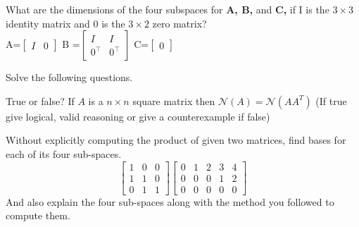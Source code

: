 \documentclass[solution,addpoints,12pt]{exam}
\begin{document}
\begin{questions}
\question[1] 
What are the dimensions of the four subspaces for \textbf{A, B,} and \textbf{C,} if I is the $3 \times 3$
identity matrix and 0 is the $3 \times 2$ zero matrix?\\
 A=$ \begin{bmatrix}
I & 0
\end{bmatrix} $ 
B =$ \begin{bmatrix}
I& I\\ 0^\top & 0^\top
\end{bmatrix}$
C=$\begin{bmatrix}
0
\end{bmatrix}$
\begin{solution}

\end{solution}


\question[2] 
Solve the following questions.

\question[1] 
True or false? If $A$ is a $n\times n$ square matrix then $\mathcal{N}(A) = \mathcal{N}(AA^T)$ (If true give logical, valid reasoning or give a counterexample if false)
\begin{solution}

\end{solution}

\question[2] 
Without explicitly computing the product of given two matrices, find bases for each of its four sub-spaces.
$$\begin{bmatrix}
1 & 0 & 0\\
1 & 1 & 0\\
0 & 1 & 1
\end{bmatrix}
\begin{bmatrix}
0 & 1 & 2 & 3 & 4\\
0 & 0 & 0 & 1 & 2\\
0 & 0 & 0 & 0 & 0
\end{bmatrix}
$$
And also explain the four sub-spaces along with the method you followed to compute them.


\end{questions}
\end{document}
